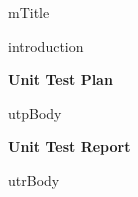 \documentclass[11pt]{article}
\begin{document}
	
{mTitle}

\setcounter{tocdepth}{3}
\setcounter{secnumdepth}{5}
\hypersetup{
	linkcolor = black  
}
\tableofcontents
\newpage

{introduction}
\newpage

{\centering \textbf{\LARGE Unit Test Plan} \par}
\vspace{2cm}
{utpBody}
\newpage

{\centering \textbf{\LARGE Unit Test Report} \par}
\vspace{2cm}
{utrBody}
\end{document}

